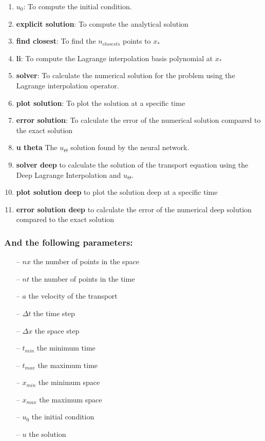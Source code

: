 \documentclass{article}
\begin{document}
\begin{enumerate}
   \item \textbf{$u_0$}: To compute the initial condition.
   \item \textbf{explicit solution}: To compute the analytical solution
   \item \textbf{find closest}: To find the $n_{closests}$ points to $x_{*}$
   \item \textbf{li}: To compute the Lagrange interpolation basis polynomial at $x_{*}$
   \item \textbf{solver}: To calculate the numerical solution for the problem using the Lagrange interpolation operator.
   \item \textbf{plot solution}: To plot the solution at a specific time
   \item \textbf{error solution}: To calculate the error of the numerical solution compared to the exact solution
   \item \textbf{u theta}  The $u_{\Theta}$ solution found by the neural network.
   \item \textbf{solver deep} to calculate the solution of the transport equation using the Deep Lagrange Interpolation and $u_{\Theta}$.
   \item \textbf{plot solution deep} to plot the solution deep at a specific time
   \item \textbf{error solution deep} to calculate the error of the numerical deep solution compared to the exact solution
\end{enumerate}

\subsubsection*{And the following parameters:}

\begin{itemize}
    \item[--] $nx$ the number of points in the space
    \item[--] $nt$ the number of points in the time
    \item[--] $a$ the velocity of the transport
    \item[--] $\Delta t$ the time step
    \item[--] $\Delta x$ the space step
    \item[--] $t_{min}$ the minimum time
    \item[--] $t_{max}$ the maximum time
    \item[--] $x_{min}$ the minimum space
    \item[--] $x_{max}$ the maximum space
    \item[--] $u_0$ the initial condition
    \item[--] $u$ the solution
 \end{itemize}
\end{document}
